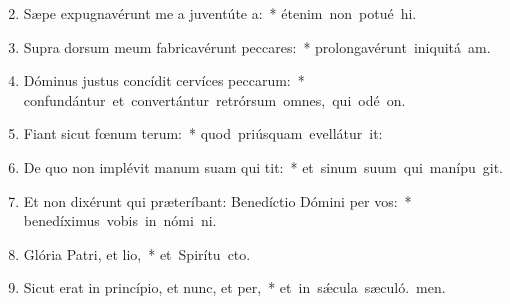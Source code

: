 \begin{flushleft}
\begin{enumerate}[leftmargin=*]
\setcounter{enumi}{1}

\item Sæpe expugnavérunt me a juventúte a:~* \mbox{étenim non potué hi.}
\item Supra dorsum meum fabricavérunt peccares:~* \mbox{prolongavérunt iniquitá am.}
\item Dóminus justus concídit cervíces peccarum:~* \mbox{confundántur et convertántur retrórsum omnes, qui odé on.}
\item Fiant sicut fœnum terum:~* \mbox{quod priúsquam evellátur it:}
\item De quo non implévit manum suam qui tit:~* \mbox{et sinum suum qui manípu git.}
\item Et non dixérunt qui præteríbant: Benedíctio Dómini per vos:~* \mbox{benedíximus vobis in nómi ni.}
\item Glória Patri, et lio,~* \mbox{et Spirítu cto.}
\item Sicut erat in princípio, et nunc, et per,~* \mbox{et in s\'{\ae}cula sæculó. men.}

\end{enumerate}
\end{flushleft}

